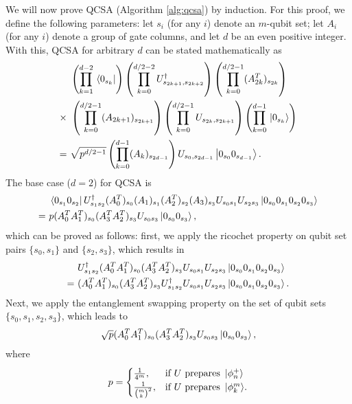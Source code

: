 \documentclass[10pt]{article}
\begin{document}
We will now prove QCSA (Algorithm \ref{alg:qcsa}) by induction. For this proof, we define the following parameters: let $s_i$ (for any $i$) denote an $m$-qubit set; let $A_i$ (for any $i$) denote a group of gate columns, and let $d$ be an even positive integer. With this, QCSA for arbitrary $d$ can be stated mathematically as
\begin{align}
\label{qcsa_statement}
&
\left(\prod_{k=1}^{d-2}\bra*{0_{s_k}}\right)
\left(\prod_{k=0}^{d/2-2}U^\dagger_{s_{2k+1},s_{2k+2}}\right)
\left(\prod_{k=0}^{d/2-1}(A^T_{2k})_{s_{2k}}\right)
\nonumber
\\
\times \ &
\left(\prod_{k=0}^{d/2-1}(A_{2k+1})_{s_{2k+1}}\right)
\left(\prod_{k=0}^{d/2-1}U_{s_{2k},s_{2k+1}}\right)
\left(\prod_{k=0}^{d-1}\ket*{0_{s_k}}\right)
\nonumber
\\
= \ &
\sqrt{p^{d/2-1}}\left(\prod_{k=0}^{d-1}(A_k)_{s_{2d-1}}\right)U_{s_{0},s_{2d-1}}\ket{0_{s_0}0_{s_{d-1}}}.
\end{align}
The base case ($d=2$) for QCSA is
\begin{align}
& \bra{0_{s_1}0_{s_2}}U^\dagger_{s_1s_2}(A^T_0)_{s_0}(A_1)_{s_1}(A^T_2)_{s_2}(A_3)_{s_3}U_{s_0s_1}U_{s_2s_3}\ket{0_{s_0}0_{s_1}0_{s_2}0_{s_3}}
\\
=\ &
p(A^T_0A^T_1)_{s_0}(A^T_3A^T_2)_{s_3}U_{s_0s_3}\ket{0_{s_0}0_{s_3}},
\end{align}
which can be proved as follows: first, we apply the ricochet property on qubit set pairs $\{s_0,s_1\}$ and $\{s_2,s_3\}$, which results in
\begin{align}
& U^\dagger_{s_1s_2}(A^T_0A^T_1)_{s_0}(A^T_3A^T_2)_{s_3}U_{s_0s_1}U_{s_2s_3}\ket{0_{s_0}0_{s_1}0_{s_2}0_{s_3}}
\\
=\ & (A^T_0A^T_1)_{s_0}(A^T_3A^T_2)_{s_3}U^\dagger_{s_1s_2}U_{s_0s_1}U_{s_2s_3}\ket{0_{s_0}0_{s_1}0_{s_2}0_{s_3}}.
\end{align}
Next, we apply the entanglement swapping property on the set of qubit sets $\{s_0,s_1,s_2,s_3\}$, which leads to
\begin{align}
\sqrt{p}(A^T_0A^T_1)_{s_0}(A^T_3A^T_2)_{s_3}U_{s_0s_3}\ket{0_{s_0}0_{s_3}},
\end{align}
where 
\begin{align}
p =
\begin{cases}
\frac{1}{4^m}, & \text{if $U$ prepares $\ket*{\phi^+_n}$} \\
\frac{1}{{m \choose k}^2}, & \text{if $U$ prepares $\ket*{\phi^m_k}$}.
\end{cases}
\end{align}
\end{document}
